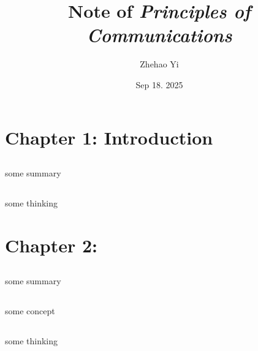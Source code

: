 \documentclass[12pt,a4paper]{book}
\title{Note of \textit{Principles of Communications}}
\author{Zhehao Yi}
\date{Sep 18. 2025}
\begin{document}
\maketitle
\tableofcontents
\newpage

\chapter{Chapter 1: Introduction}
\section{}
\begin{notebox}[Summary]
some summary
\end{notebox}

\section{}
\begin{notebox}[Thinking]
some thinking
\end{notebox}

\chapter{Chapter 2:}
\section{}
\begin{notebox}[Summary]
some summary
\end{notebox}

\section{}
\begin{notebox}[Concept]
some concept 
\end{notebox}

\section{}
\begin{notebox}[Thinking]
some thinking
\end{notebox}
\end{document}
